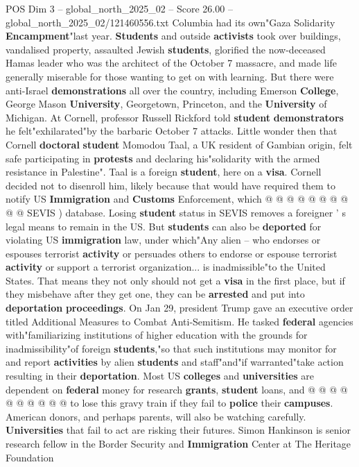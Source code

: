 \begin{textsample}{POS Dim 3 – global\_north\_2025\_02 – Score 26.00 – global\_north\_2025\_02/121460556.txt}
Columbia had its own"Gaza Solidarity \textbf{Encampment}"last year. \textbf{Students} and outside \textbf{activists} took over buildings, vandalised property, assaulted Jewish \textbf{students}, glorified the now-deceased Hamas leader who was the architect of the October 7 massacre, and made life generally miserable for those wanting to get on with learning.
But there were anti-Israel \textbf{demonstrations} all over the country, including Emerson \textbf{College}, George Mason \textbf{University}, Georgetown, Princeton, and the \textbf{University} of Michigan.
At Cornell, professor Russell Rickford told \textbf{student} \textbf{demonstrators} he felt"exhilarated"by the barbaric October 7 attacks.
Little wonder then that Cornell \textbf{doctoral} \textbf{student} Momodou Taal, a UK resident of Gambian origin, felt safe participating in \textbf{protests} and declaring his"solidarity with the armed resistance in Palestine".
Taal is a foreign \textbf{student}, here on a \textbf{visa}.
Cornell decided not to disenroll him, likely because that would have required them to notify US \textbf{Immigration} and \textbf{Customs} Enforcement, which @ @ @ @ @ @ @ @ @ @ SEVIS ) database.
Losing \textbf{student} status in SEVIS removes a foreigner ' s legal means to remain in the US.
But \textbf{students} can also be \textbf{deported} for violating US \textbf{immigration} law, under which"Any alien -- who endorses or espouses terrorist \textbf{activity} or persuades others to endorse or espouse terrorist \textbf{activity} or support a terrorist organization... is inadmissible"to the United States.
That means they not only should not get a \textbf{visa} in the first place, but if they misbehave after they get one, they can be \textbf{arrested} and put into \textbf{deportation} \textbf{proceedings}.
On Jan 29, president Trump gave an executive order titled Additional Measures to Combat Anti-Semitism.
He tasked \textbf{federal} agencies with"familiarizing institutions of higher education with the grounds for inadmissibility"of foreign \textbf{students},"so that such institutions may monitor for and report \textbf{activities} by alien \textbf{students} and staff"and"if warranted"take action resulting in their \textbf{deportation}.
Most US \textbf{colleges} and \textbf{universities} are dependent on \textbf{federal} money for research \textbf{grants}, \textbf{student} loans, and @ @ @ @ @ @ @ @ @ @ to lose this gravy train if they fail to \textbf{police} their \textbf{campuses}.
American donors, and perhaps parents, will also be watching carefully. \textbf{Universities} that fail to act are risking their futures.
Simon Hankinson is senior research fellow in the Border Security and \textbf{Immigration} Center at The Heritage Foundation

\end{textsample}
